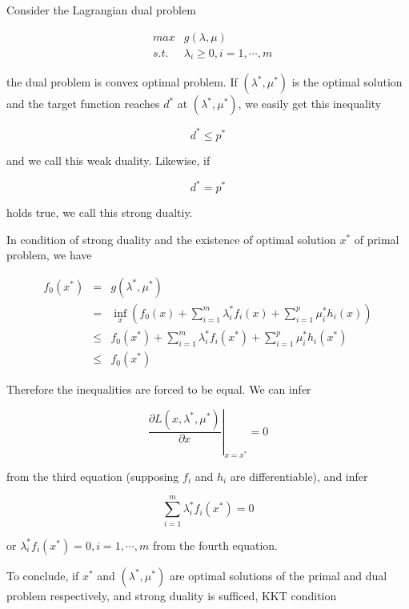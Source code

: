 \documentclass[UTF8]{ctexart}
\begin{document}
Consider the Lagrangian dual problem\par
\begin{eqnarray*}
 &max&g(\lambda,\mu)\\
&s.t.&\lambda_{i}\geq 0,i=1,\cdots,m
\end{eqnarray*}\par
the dual problem is convex optimal problem. If $(\lambda^{*},\mu^{*})$ is the optimal solution and the target function reaches $d^{*}$ at $(\lambda^{*},\mu^{*})$, we easily get this inequality\par
\begin{equation*}
d^{*}\leq p^{*}
\end{equation*}\par
and we call this weak duality. Likewise, if\par
\begin{equation*}
d^{*}=p^{*}
\end{equation*}\par
holds true, we call this strong dualtiy.\par
In condition of strong duality and the existence of optimal solution $x^{*}$ of primal problem, we have\par
\begin{eqnarray}
f_{0}(x^{*})&=&g(\lambda^{*},\mu^{*})\\
&=&\inf_{x}(f_{0}(x)+\sum_{i=1}^{m}\lambda_{i}^{*}f_{i}(x)+\sum_{i=1}^{p}\mu_{i}^{*}h_{i}(x))\\
&\leq&f_{0}(x^{*})+\sum_{i=1}^{m}\lambda_{i}^{*}f_{i}(x^{*})+\sum_{i=1}^{p}\mu_{i}^{*}h_{i}(x^{*})\\
&\leq&f_{0}(x^{*})
\end{eqnarray}\par
Therefore the inequalities are forced to be equal. We can infer\par
\begin{equation*}
\left.\frac{\partial L(x,\lambda^{*},\mu^{*})}{\partial x}\right|_{x=x^{*}}=0
\end{equation*}\par
from the third equation (supposing $f_{i}$ and $h_{i}$ are differentiable), and infer\par
\begin{equation*}
\sum_{i=1}^{m}\lambda_{i}^{*}f_{i}(x^{*})=0
\end{equation*}\par
or $\lambda_{i}^{*}f_{i}(x^{*})=0,i=1,\cdots,m$ from the fourth equation.\par
To conclude, if $x^{*}$ and $(\lambda^{*},\mu^{*})$ are optimal solutions of the primal and dual problem respectively, and strong duality is sufficed, KKT condition\par
\end{document}
